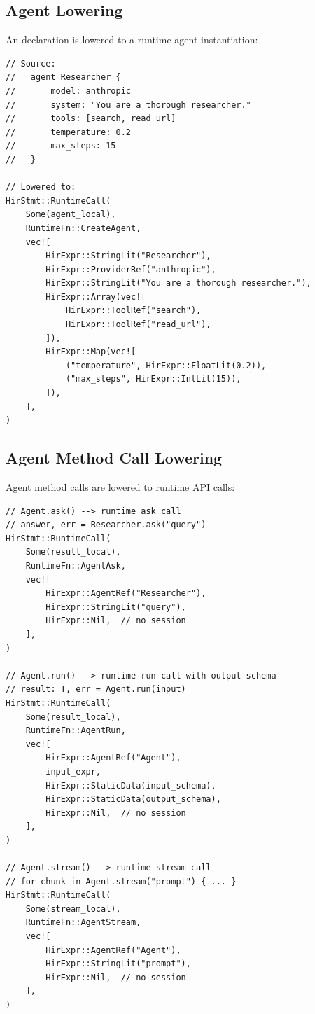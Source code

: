 \subsection{Agent Lowering}

An  declaration is lowered to a runtime agent instantiation:

\begin{lstlisting}[language={}]
// Source:
//   agent Researcher {
//       model: anthropic
//       system: "You are a thorough researcher."
//       tools: [search, read_url]
//       temperature: 0.2
//       max_steps: 15
//   }

// Lowered to:
HirStmt::RuntimeCall(
    Some(agent_local),
    RuntimeFn::CreateAgent,
    vec![
        HirExpr::StringLit("Researcher"),
        HirExpr::ProviderRef("anthropic"),
        HirExpr::StringLit("You are a thorough researcher."),
        HirExpr::Array(vec![
            HirExpr::ToolRef("search"),
            HirExpr::ToolRef("read_url"),
        ]),
        HirExpr::Map(vec![
            ("temperature", HirExpr::FloatLit(0.2)),
            ("max_steps", HirExpr::IntLit(15)),
        ]),
    ],
)
\end{lstlisting}

\subsection{Agent Method Call Lowering}

Agent method calls are lowered to runtime API calls:

\begin{lstlisting}[language={}]
// Agent.ask() --> runtime ask call
// answer, err = Researcher.ask("query")
HirStmt::RuntimeCall(
    Some(result_local),
    RuntimeFn::AgentAsk,
    vec![
        HirExpr::AgentRef("Researcher"),
        HirExpr::StringLit("query"),
        HirExpr::Nil,  // no session
    ],
)

// Agent.run() --> runtime run call with output schema
// result: T, err = Agent.run(input)
HirStmt::RuntimeCall(
    Some(result_local),
    RuntimeFn::AgentRun,
    vec![
        HirExpr::AgentRef("Agent"),
        input_expr,
        HirExpr::StaticData(input_schema),
        HirExpr::StaticData(output_schema),
        HirExpr::Nil,  // no session
    ],
)

// Agent.stream() --> runtime stream call
// for chunk in Agent.stream("prompt") { ... }
HirStmt::RuntimeCall(
    Some(stream_local),
    RuntimeFn::AgentStream,
    vec![
        HirExpr::AgentRef("Agent"),
        HirExpr::StringLit("prompt"),
        HirExpr::Nil,  // no session
    ],
)
\end{lstlisting}

